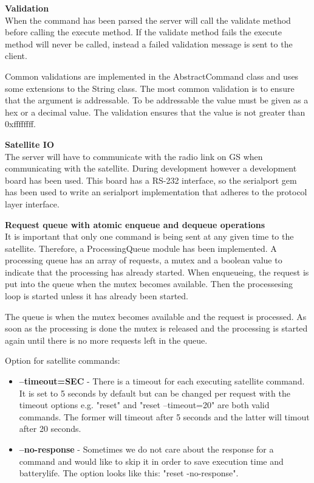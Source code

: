 \textbf{Validation} \\
When the command has been parsed the server will call the validate method before calling the execute method. If the validate method fails the execute method will never be called, instead a failed validation message is sent to the client.

Common validations are implemented in the AbstractCommand class and uses some extensions to the String class. The most common validation is to ensure that the argument is addressable. To be addressable the value must be given as a hex or a decimal value. The validation ensures that the value is not greater than 0xffffffff.

\textbf{Satellite IO} \\
The server will have to communicate with the radio link on GS when communicating with the satellite. During development however a development board has been used. This board has a RS-232 interface, so the serialport gem has been used to write an serialport implementation that adheres to the protocol layer interface.

\textbf{Request queue with atomic enqueue and dequeue operations} \\
It is important that only one command is being sent at any given time to the satellite. Therefore, a ProcessingQueue module has been implemented. A processing queue has an array of requests, a mutex and a boolean value to indicate that the processing has already started. When enqueueing, the request is put into the queue when the mutex becomes available. Then the processesing loop is started unless it has already been started.

The queue is when the mutex becomes available and the request is processed. As soon as the processing is done the mutex is released and the processing is started again until there is no more requests left in the queue.

Option for satellite commands:
\begin{itemize}
	\item \textbf{--timeout=SEC} - There is a timeout for each executing satellite command. It is set to 5 seconds by default but can be changed per request with the timeout options e.g. "reset" and "reset --timeout=20" are both valid commands. The former will timeout after 5 seconds and the latter will timout after 20 seconds.
	\item \textbf{--no-response} - Sometimes we do not care about the response for a command and would like to skip it in order to save execution time and batterylife. The option looks like this: "reset -no-response".
\end{itemize}

